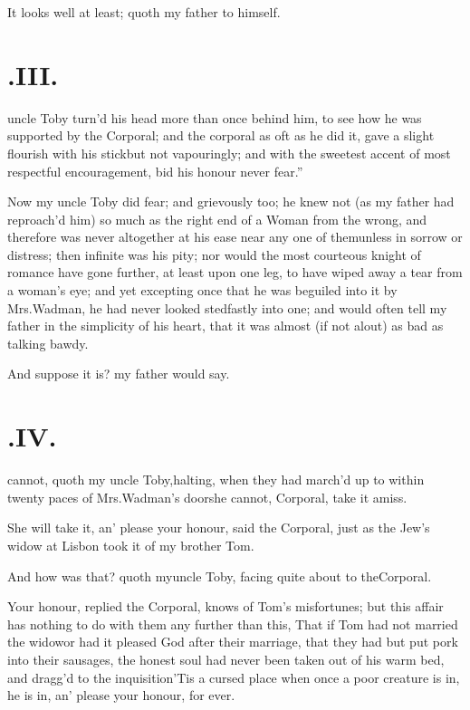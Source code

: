 \documentclass{article}
\begin{document}
\tsh It looks well at least; quoth my father to
himself.

\vfill{}\eject
\null{}\baselineskip
\section{.\enspace III.}

 uncle Toby turn’d his
head more than once behind him, to see how he was supported by the
Corporal; and the corporal as oft as he did it, gave a slight
flourish with his stick\tsk but not vapouringly; and with the
sweetest accent of most respectful encouragement, bid his honour
\lqq never fear.”

Now my uncle Toby did fear; and grievously too; he knew
not (as my father had reproach’d him) so much as the right
end of a Woman from the wrong, and therefore was never altogether
at his ease near any one of them\tsh unless in
sorrow or distress; then infinite was his pity; nor would the most
courteous\etp{} knight of romance have gone further, at least upon one
leg, to have wiped away a tear from a woman’s eye; and yet
excepting once that he was beguiled into it by Mrs.\@ Wadman,
he had never looked stedfastly into one; and would often tell my
father in the simplicity of his heart, that it was almost (if not
alout) as bad as talking bawdy.\tsh

\tsh And suppose it is? my father would say.

\vfill{}\eject
\null{}\baselineskip
\section{.\enspace IV.}

 cannot, quoth my uncle
Toby,\break halting, when they had march’d up to within
twenty paces of Mrs.\@ Wadman’s door\tsk she cannot,
Corporal, take it amiss.\tsh

\tsh She will take it, an’ please your honour,
said the Corporal, just as the Jew’s widow at
Lisbon took it of my brother Tom.\tsh

\tsh And how was that? quoth my\break uncle Toby,
facing quite about to the\break Corporal.

Your honour, replied the Corporal, knows of Tom’s
misfortunes; but this affair has nothing to do with them any
further than this, That if Tom had not married the
widow\tsk or had it pleased God after their marriage, that
they had but put pork into their sausages, the honest soul had
never been taken out of his warm bed, and dragg’d to the
inquisition\tsk ’Tis a cursed place\tsk\break
{}
\tsk when once a poor creature is in,
he is in, an’ please your honour, for ever.
\end{document}
